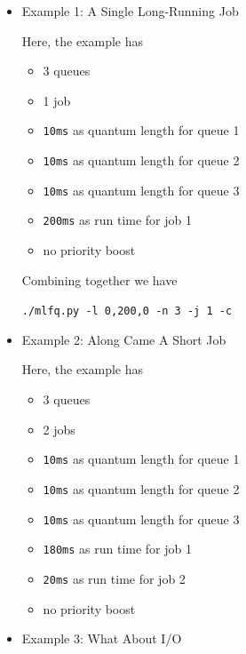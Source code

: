 \documentclass[12pt]{article}
\begin{document}
\begin{enumerate}[1.]
    \bigskip

    \begin{itemize}
        \item Example 1: A Single Long-Running Job

        \bigskip

        Here, the example has

        \begin{itemize}
            \item 3 queues
            \item 1 job
            \item \texttt{10ms} as quantum length for queue 1
            \item \texttt{10ms} as quantum length for queue 2
            \item \texttt{10ms} as quantum length for queue 3
            \item \texttt{200ms} as run time for job 1
            \item no priority boost
        \end{itemize}

        \bigskip

        Combining together we have

        \texttt{./mlfq.py -l 0,200,0 -n 3 -j 1 -c}

        \item Example 2: Along Came A Short Job

        \bigskip

        Here, the example has

        \begin{itemize}
            \item 3 queues
            \item 2 jobs
            \item \texttt{10ms} as quantum length for queue 1
            \item \texttt{10ms} as quantum length for queue 2
            \item \texttt{10ms} as quantum length for queue 3
            \item \texttt{180ms} as run time for job 1
            \item \texttt{20ms} as run time for job 2
            \item no priority boost
        \end{itemize}

        \bigskip


        \item Example 3: What About I/O
    \end{itemize}


\end{enumerate}
\end{document}
